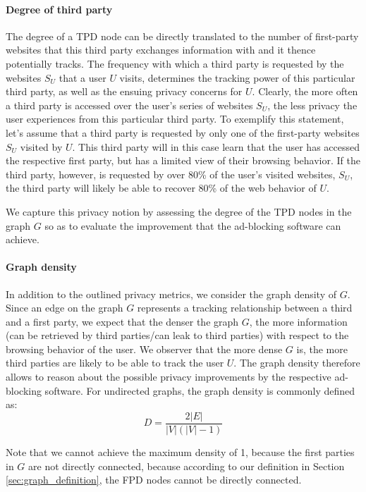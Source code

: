 \documentclass{sig-alternate}
\begin{document}
\paragraph{Degree of third party}
The degree of a TPD node can be directly translated to the number of first-party websites that this third party exchanges information with and it thence potentially tracks. The frequency with which a third party is requested by the websites $S_U$ that a user $U$ visits, determines the tracking power of this particular third party, as well as the ensuing privacy concerns for $U$.
Clearly, the more often a third party is accessed over the user's series of websites $S_U$, the less privacy the user experiences from this particular third party. To exemplify this statement, let's assume that a third party is requested by only one of the first-party websites $S_U$ visited by $U$. This third party will in this case learn that the user has accessed the respective first party, but has a limited view of their browsing behavior. If the third party, however, is requested by over 80\% of the user's visited websites, $S_U$, the third party will likely be able to recover 80\% of the web behavior of $U$.

We capture this privacy notion by assessing the degree of the TPD nodes in the graph $G$ so as to evaluate the improvement that the ad-blocking software can achieve.

\paragraph{Graph density}
In addition to the outlined privacy metrics, we consider the graph density of $G$. Since an edge on the graph $G$ represents a tracking relationship between a third and a first party, we expect that the denser the graph $G$, the more information (can be retrieved by third parties/can leak to third parties) with respect to the browsing behavior of the user. We observer that the more dense $G$ is, the more third parties are likely to be able to track the user $U$. The graph density therefore allows to reason about the possible privacy improvements by the respective ad-blocking software. For undirected graphs, the graph density is commonly defined as:
\begin{equation}
D = \frac{2 |E|}{|V|(|V|-1)}
\end{equation}

Note that we cannot achieve the maximum density of 1, because the first parties in $G$ are not directly connected, because according to our definition in Section \ref{sec:graph_definition}, the FPD nodes cannot be directly connected.
\end{document}

